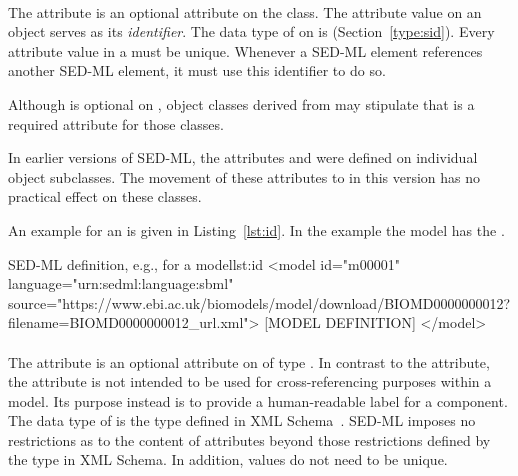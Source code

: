 \begin{blockChanged}

\paragraph*{}
\label{sec:id}
The  attribute is an optional attribute on the \SEDBase class.  The  attribute value on an object serves as its \emph{identifier}.  The data type of  on \SEDBase is  (Section~\ref{type:sid}).  Every  attribute value in a \SedDocument must be unique.  Whenever a SED-ML element references another SED-ML element, it must use this identifier to do so.

Although  is optional on \SEDBase, object classes derived from \SEDBase may stipulate that  is a required attribute for those classes.

In earlier versions of SED-ML, the attributes  and  were defined on individual object subclasses.  The movement of these attributes to \SEDBase in this version has no practical effect on these classes.

An example for an  is given in Listing~\ref{lst:id}. In the example the model has the  .

\begin{myXmlLst}{SED-ML  definition, e.g., for a model}{lst:id}
<model id="m00001" language="urn:sedml:language:sbml"
        source="https://www.ebi.ac.uk/biomodels/model/download/BIOMD0000000012?filename=BIOMD0000000012_url.xml">
	[MODEL DEFINITION]
</model>
\end{myXmlLst}


\paragraph*{}
\label{sec:name}
The attribute  is an optional attribute on \SEDBase of type .  
In contrast to the  attribute, the  attribute
is not intended to be used for cross-referencing
purposes within a model.  Its purpose instead is to provide a
human-readable label for a component.  The data type of 
 is the type  defined in XML
Schema~\citep{biron:2000,thompson:2000}.  SED-ML imposes no restrictions
as to the content of  attributes beyond those restrictions
defined by the  type in XML Schema.
In addition,  values do not need to be unique.


\end{blockChanged}
